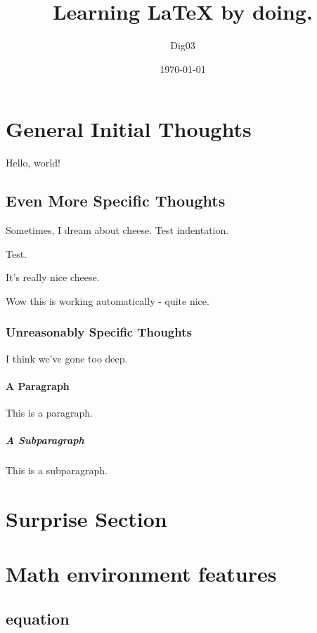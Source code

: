 \documentclass{article}
\title{Learning \LaTeX{} by doing.}
\date{\today}
\author{Dig03}
\begin{document}
\maketitle %
\newpage   %

\section{General Initial Thoughts}

Hello, world!

\subsection{Even More Specific Thoughts}

Sometimes, I dream about cheese.
Test indentation.

Test.

It's really nice cheese.

Wow this is working automatically - quite nice.

\subsubsection{Unreasonably Specific Thoughts}

I think we've gone too deep.

\paragraph{A Paragraph}

This is a paragraph.

\subparagraph{A Subparagraph}

This is a subparagraph.

\section{Surprise Section}

\section{Math environment features}

\subsection{equation}
\end{document}
